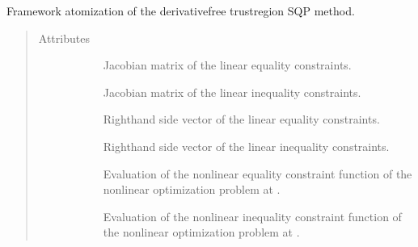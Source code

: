 \documentclass[letterpaper,10pt,english]{sphinxmanual}
\begin{document}
\begin{fulllineitems}
\label{\detokenize{refs/generated/cobyqa.optimize.TrustRegion:cobyqa.optimize.TrustRegion}}
\sphinxAtStartPar
Framework atomization of the derivative\sphinxhyphen{}free trust\sphinxhyphen{}region SQP method.
\begin{quote}\begin{description}
\item[{Attributes}] \leavevmode\begin{description}
\item[{}] \leavevmode
\sphinxAtStartPar
Jacobian matrix of the linear equality constraints.

\item[{}] \leavevmode
\sphinxAtStartPar
Jacobian matrix of the linear inequality constraints.

\item[{}] \leavevmode
\sphinxAtStartPar
Right\sphinxhyphen{}hand side vector of the linear equality constraints.

\item[{}] \leavevmode
\sphinxAtStartPar
Right\sphinxhyphen{}hand side vector of the linear inequality constraints.

\item[{}] \leavevmode
\sphinxAtStartPar
Evaluation of the nonlinear equality constraint function of the nonlinear optimization problem at .

\item[{}] \leavevmode
\sphinxAtStartPar
Evaluation of the nonlinear inequality constraint function of the nonlinear optimization problem at .


\end{description}
\end{description}
\end{quote}
\end{fulllineitems}
\end{document}
